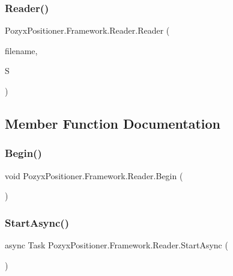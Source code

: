 \subsubsection{\texorpdfstring{Reader()}{Reader()}}
{\footnotesize\ttfamily Pozyx\+Positioner.\+Framework.\+Reader.\+Reader (\begin{DoxyParamCaption}\item[{string}]{filename,  }\item[{\hyperlink{class_pozyx_positioner_1_1_framework_1_1_sim_environment}{Sim\+Environment}}]{S }\end{DoxyParamCaption})}



\subsection{Member Function Documentation}
\mbox{\label{class_pozyx_positioner_1_1_framework_1_1_reader_aec87a650a91ac217fd0e3d7aece3484a}} 
\subsubsection{\texorpdfstring{Begin()}{Begin()}}
{\footnotesize\ttfamily void Pozyx\+Positioner.\+Framework.\+Reader.\+Begin (\begin{DoxyParamCaption}{ }\end{DoxyParamCaption})}

\mbox{\label{class_pozyx_positioner_1_1_framework_1_1_reader_aa384522a8caca942f2becd73031ac77d}} 
\subsubsection{\texorpdfstring{Start\+Async()}{StartAsync()}}
{\footnotesize\ttfamily async Task Pozyx\+Positioner.\+Framework.\+Reader.\+Start\+Async (\begin{DoxyParamCaption}{ }\end{DoxyParamCaption})}

